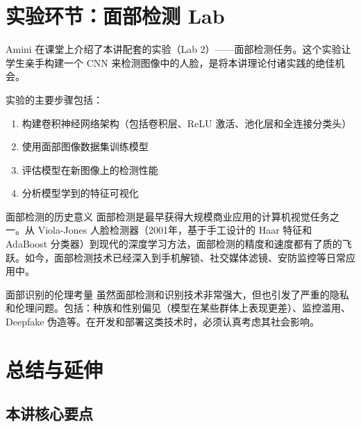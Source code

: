 \documentclass[a4paper]{article}
\begin{document}
\newpage
\section{实验环节：面部检测 Lab}

Amini 在课堂上介绍了本讲配套的实验（Lab 2）——面部检测任务。这个实验让学生亲手构建一个 CNN 来检测图像中的人脸，是将本讲理论付诸实践的绝佳机会。

实验的主要步骤包括：
\begin{enumerate}
    \item 构建卷积神经网络架构（包括卷积层、ReLU 激活、池化层和全连接分类头）
    \item 使用面部图像数据集训练模型
    \item 评估模型在新图像上的检测性能
    \item 分析模型学到的特征可视化
\end{enumerate}

\begin{knowledgebox}{面部检测的历史意义}
面部检测是最早获得大规模商业应用的计算机视觉任务之一。从 Viola-Jones 人脸检测器（2001年，基于手工设计的 Haar 特征和 AdaBoost 分类器）到现代的深度学习方法，面部检测的精度和速度都有了质的飞跃。如今，面部检测技术已经深入到手机解锁、社交媒体滤镜、安防监控等日常应用中。
\end{knowledgebox}

\begin{warningbox}{面部识别的伦理考量}
虽然面部检测和识别技术非常强大，但也引发了严重的隐私和伦理问题。包括：种族和性别偏见（模型在某些群体上表现更差）、监控滥用、Deepfake 伪造等。在开发和部署这类技术时，必须认真考虑其社会影响。
\end{warningbox}

\newpage
\section{总结与延伸}

\subsection{本讲核心要点}
\end{document}
